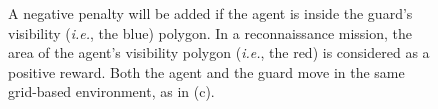\documentclass[10 pt, conference]{ieeeconf}
\newcommand{\ie}{\emph{i.e.}}
\newcommand{\PT}[1]{{\footnotesize\color{blue}[{\bf PT:} \textsf{#1}]}} %
\begin{document}
\begin{figure}
\caption{A negative penalty will be added if the agent is inside the guard's visibility (\ie, the blue) polygon. In a reconnaissance mission, the area of the agent's visibility polygon (\ie, the red) is considered as a positive reward. Both the agent and the guard move in the same grid-based environment, as in (c). }
\label{Detected_or_not}         
\end{figure}
\end{document}
